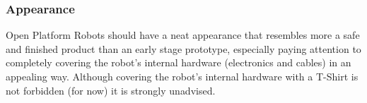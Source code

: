 \subsubsection{Appearance}
\label{rule:robots_appearance}
Open Platform Robots should have a neat appearance that resembles more a safe and finished product than an early stage prototype, especially paying attention to completely covering the robot's internal hardware (electronics and cables) in an appealing way.
Although covering the robot's internal hardware with a T-Shirt is not forbidden (for now) it is strongly unadvised.